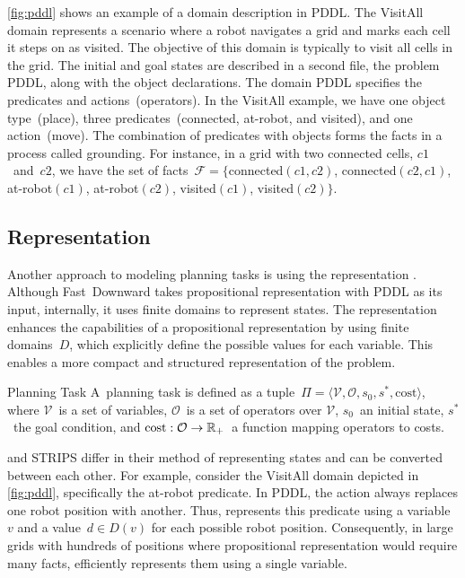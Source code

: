 \cref{fig:pddl} shows an example of a domain description in PDDL. The VisitAll domain represents a scenario where a robot navigates a grid and marks each cell it steps on as visited. The objective of this domain is typically to visit all cells in the grid. The initial and goal states are described in a second file, the problem PDDL, along with the object declarations. The domain PDDL specifies the predicates and actions~(operators). In the VisitAll example, we have one object type~(place), three predicates~(connected, at-robot, and visited), and one action~(move). The combination of predicates with objects forms the facts in a process called grounding. For instance, in a grid with two connected cells, $c1$~and~$c2$, we have the set of facts~$\mathcal{F}=\{$connected$(c1,c2)$, \mbox{connected$(c2,c1)$}, \mbox{at-robot$(c1)$}, \mbox{at-robot$(c2)$}, \mbox{visited$(c1)$}, visited$(c2)\}$.

\subsection{\sas Representation}
\label{sec:sasplus}

Another approach to modeling planning tasks is using the \sas representation \cite{backstrom1995complexity}. Although Fast~Downward takes propositional representation with PDDL as its input, internally, it uses finite domains to represent states. The \sas representation enhances the capabilities of a propositional representation by using finite domains~$D$, which explicitly define the possible values for each variable. This enables a more compact and structured representation of the problem.

\begin{definition}{\sas Planning Task}
    \label{def:sasplus}
    A~\sas planning task is defined as a tuple~$\Pi=\langle\mathcal{V},\mathcal{O},s_0,s^*, \text{cost}\rangle$, where $\mathcal{V}$~is a set of variables, $\mathcal{O}$~is a set of operators over $\mathcal{V}$, $s_0$~an initial state, $s^*$~the goal condition, and $\text{cost}:\mathcal{O}\rightarrow\mathbb{R}_{+}$~a function mapping operators to costs.
\end{definition}

\sas and STRIPS differ in their method of representing states and can be converted between each other. For example, consider the VisitAll domain depicted in \cref{fig:pddl}, specifically the at-robot predicate. In PDDL, the action always replaces one robot position with another. Thus, \sas represents this predicate using a variable~$v$ and a value~$d \in D(v)$ for each possible robot position. Consequently, in large grids with hundreds of positions where propositional representation would require many facts, \sas efficiently represents them using a single variable.

